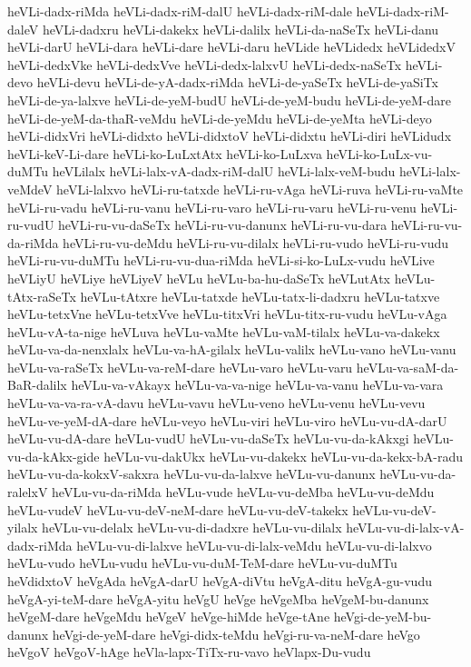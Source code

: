 {heVLi-dadx-riMda
heVLi-dadx-riM-dalU
heVLi-dadx-riM-dale
heVLi-dadx-riM-daleV
heVLi-dadxru
heVLi-dakekx
heVLi-dalilx
heVLi-da-naSeTx
heVLi-danu
heVLi-darU
heVLi-dara
heVLi-dare
heVLi-daru
heVLide
heVLidedx
heVLidedxV
heVLi-dedxVke
heVLi-dedxVve
heVLi-dedx-lalxvU
heVLi-dedx-naSeTx
heVLi-devo
heVLi-devu
heVLi-de-yA-dadx-riMda
heVLi-de-yaSeTx
heVLi-de-yaSiTx
heVLi-de-ya-lalxve
heVLi-de-yeM-budU
heVLi-de-yeM-budu
heVLi-de-yeM-dare
heVLi-de-yeM-da-thaR-veMdu
heVLi-de-yeMdu
heVLi-de-yeMta
heVLi-deyo
heVLi-didxVri
heVLi-didxto
heVLi-didxtoV
heVLi-didxtu
heVLi-diri
heVLidudx
heVLi-keV-Li-dare
heVLi-ko-LuLxtAtx
heVLi-ko-LuLxva
heVLi-ko-LuLx-vu-duMTu
heVLilalx
heVLi-lalx-vA-dadx-riM-dalU
heVLi-lalx-veM-budu
heVLi-lalx-veMdeV
heVLi-lalxvo
heVLi-ru-tatxde
heVLi-ru-vAga
heVLi-ruva
heVLi-ru-vaMte
heVLi-ru-vadu
heVLi-ru-vanu
heVLi-ru-varo
heVLi-ru-varu
heVLi-ru-venu
heVLi-ru-vudU
heVLi-ru-vu-daSeTx
heVLi-ru-vu-danunx
heVLi-ru-vu-dara
heVLi-ru-vu-da-riMda
heVLi-ru-vu-deMdu
heVLi-ru-vu-dilalx
heVLi-ru-vudo
heVLi-ru-vudu
heVLi-ru-vu-duMTu
heVLi-ru-vu-dua-riMda
heVLi-si-ko-LuLx-vudu
heVLive
heVLiyU
heVLiye
heVLiyeV
heVLu
heVLu-ba-hu-daSeTx
heVLutAtx
heVLu-tAtx-raSeTx
heVLu-tAtxre
heVLu-tatxde
heVLu-tatx-li-dadxru
heVLu-tatxve
heVLu-tetxVne
heVLu-tetxVve
heVLu-titxVri
heVLu-titx-ru-vudu
heVLu-vAga
heVLu-vA-ta-nige
heVLuva
heVLu-vaMte
heVLu-vaM-tilalx
heVLu-va-dakekx
heVLu-va-da-nenxlalx
heVLu-va-hA-gilalx
heVLu-valilx
heVLu-vano
heVLu-vanu
heVLu-va-raSeTx
heVLu-va-reM-dare
heVLu-varo
heVLu-varu
heVLu-va-saM-da-BaR-dalilx
heVLu-va-vAkayx
heVLu-va-va-nige
heVLu-va-vanu
heVLu-va-vara
heVLu-va-va-ra-vA-davu
heVLu-vavu
heVLu-veno
heVLu-venu
heVLu-vevu
heVLu-ve-yeM-dA-dare
heVLu-veyo
heVLu-viri
heVLu-viro
heVLu-vu-dA-darU
heVLu-vu-dA-dare
heVLu-vudU
heVLu-vu-daSeTx
heVLu-vu-da-kAkxgi
heVLu-vu-da-kAkx-gide
heVLu-vu-dakUkx
heVLu-vu-dakekx
heVLu-vu-da-kekx-bA-radu
heVLu-vu-da-kokxV-sakxra
heVLu-vu-da-lalxve
heVLu-vu-danunx
heVLu-vu-da-ralelxV
heVLu-vu-da-riMda
heVLu-vude
heVLu-vu-deMba
heVLu-vu-deMdu
heVLu-vudeV
heVLu-vu-deV-neM-dare
heVLu-vu-deV-takekx
heVLu-vu-deV-yilalx
heVLu-vu-delalx
heVLu-vu-di-dadxre
heVLu-vu-dilalx
heVLu-vu-di-lalx-vA-dadx-riMda
heVLu-vu-di-lalxve
heVLu-vu-di-lalx-veMdu
heVLu-vu-di-lalxvo
heVLu-vudo
heVLu-vudu
heVLu-vu-duM-TeM-dare
heVLu-vu-duMTu
heVdidxtoV
heVgAda
heVgA-darU
heVgA-diVtu
heVgA-ditu
heVgA-gu-vudu
heVgA-yi-teM-dare
heVgA-yitu
heVgU
heVge
heVgeMba
heVgeM-bu-danunx
heVgeM-dare
heVgeMdu
heVgeV
heVge-hiMde
heVge-tAne
heVgi-de-yeM-bu-danunx
heVgi-de-yeM-dare
heVgi-didx-teMdu
heVgi-ru-va-neM-dare
heVgo
heVgoV
heVgoV-hAge
heVla-lapx-TiTx-ru-vavo
heVlapx-Du-vudu
}
